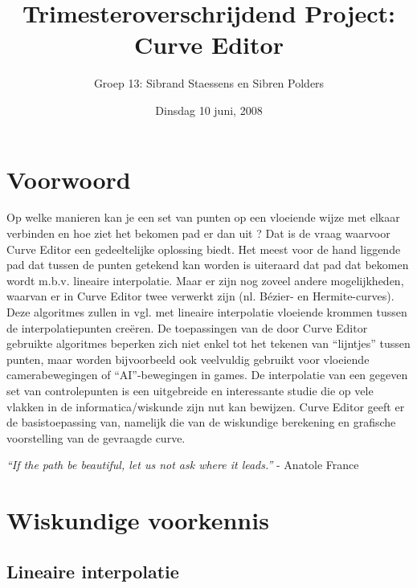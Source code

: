 \documentclass[a4paper,11pt,oneside, titlepage]{article}
\author{Groep 13: Sibrand Staessens en Sibren Polders}
\title{Trimesteroverschrijdend Project: Curve Editor}
\date{Dinsdag 10 juni, 2008}
\begin{document}
\maketitle \newpage
\tableofcontents \newpage
\section{Voorwoord}
Op welke manieren kan je een set van punten op een vloeiende wijze met elkaar verbinden en hoe ziet het bekomen pad er dan uit ? Dat is
de vraag waarvoor Curve Editor een gedeeltelijke oplossing biedt. Het meest voor de hand liggende pad dat tussen de punten getekend kan worden 
is uiteraard dat pad dat bekomen wordt m.b.v. lineaire interpolatie. Maar er zijn nog zoveel andere mogelijkheden, waarvan er in Curve Editor twee verwerkt 
zijn (nl. Bézier- en Hermite-curves). Deze algoritmes zullen in vgl. met lineaire interpolatie vloeiende krommen
tussen de interpolatiepunten cre\"eren. De toepassingen van de door Curve Editor gebruikte algoritmes beperken zich niet enkel 
tot het tekenen van ``lijntjes'' tussen punten, maar worden bijvoorbeeld ook veelvuldig gebruikt voor vloeiende camerabewegingen of ``AI''-bewegingen in games.
De interpolatie van een gegeven set van controlepunten is een uitgebreide en interessante studie die 
op vele vlakken in de informatica/wiskunde zijn nut kan bewijzen. Curve Editor geeft er de 
basistoepassing van, namelijk die van de wiskundige berekening en grafische voorstelling van de gevraagde curve. \newline \newline \newline \newline
\newline \newline \newline \newline
\begin{center}
\textit{``If the path be beautiful, let us not ask where it leads.''} - Anatole France \newpage
\end{center}
\newpage
\section{Wiskundige voorkennis\label{swv}}
\subsection{Lineaire interpolatie \label{sli}}
\end{document}
